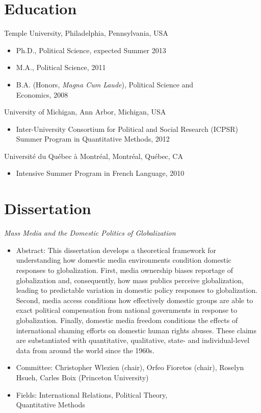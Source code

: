 \documentclass[margin, 12pt]{res} %
\begin{document}
\begin{resume}


\section{Education}
Temple University, Philadelphia, Pennsylvania, USA
\begin{itemize}
\item Ph.D., Political Science, expected Summer 2013
\item M.A., Political Science, 2011
\item B.A. (Honors, \emph{Magna Cum Laude}), Political Science and \\
Economics, 2008
\end{itemize}

University of Michigan, Ann Arbor, Michigan, USA
\begin{itemize}
\item Inter-University Consortium for Political and Social Research (ICPSR) Summer Program in Quantitative Methods,
 2012
 \end{itemize}

Universit\'{e} du Qu\'{e}bec \`{a} Montr\'{e}al, Montr\'{e}al, Qu\'{e}bec, CA
\begin{itemize}
\item Intensive Summer Program in French Language, 2010
\end{itemize}

\section{Dissertation}
\emph{Mass Media and the Domestic Politics of Globalization} \\
\begin{itemize}
\item Abstract: This dissertation develops a theoretical framework for understanding how domestic media environments condition domestic responses to globalization. First, media ownership biases reportage of globalization and, consequently, how mass publics perceive globalization, leading to predictable variation in domestic policy responses to globalization. Second, media access conditions how effectively domestic groups are able to exact political compensation from national governments in response to globalization. Finally, domestic media freedom conditions the effects of international shaming efforts on domestic human rights abuses. These claims are substantiated with quantitative, qualitative, state- and individual-level data from around the world since the 1960s.
\item Committee: Christopher Wlezien (chair), Orfeo Fioretos (chair),
Roselyn Hsueh, Carles Boix (Princeton University)
\item Fields: International Relations, Political Theory, \\
Quantitative Methods \\
\end{itemize}


\end{resume}
\end{document}
